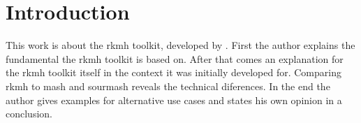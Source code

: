 \section{Introduction}

This work is about the rkmh toolkit, developed by \citeauthor{rkmh} \cite{rkmh}. First the author explains the fundamental the rkmh toolkit is based on. After that comes an explanation for the rkmh toolkit itself in the context it was initially developed for. Comparing rkmh to mash \cite{mash} and sourmash \cite{sourmash} reveals the technical diferences. In the end the author gives examples for alternative use cases and states his own opinion in a conclusion.